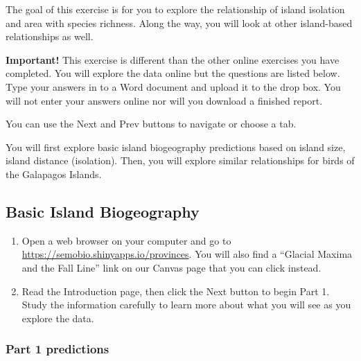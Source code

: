\documentclass[11pt, addpoints]{exam}
\begin{document}
The goal of this exercise is for you to explore the relationship of
island isolation and area with species richness. Along the way, you will
look at other island-based relationships as well.

\textbf{Important!} This exercise is different than the other online exercises you have completed. You will explore the data online but
the questions are listed below. Type your answers in to a Word document
and upload it to the drop box. You will not enter your answers online nor will you download a finished report.

You can use the Next and Prev buttons to navigate or choose a tab.

You will first explore basic island biogeography predictions based on island size, island distance (isolation). Then, you will explore similar relationships for birds of the Galapagos Islands.

\subsection*{Basic Island Biogeography}

\begin{enumerate}
	\item Open a web browser on your computer and go to \url{https://semobio.shinyapps.io/provinces}. You will also find a “Glacial Maxima and the Fall Line” link on our Canvas page that you can click instead.
	
	\item Read the Introduction page, then click the Next button to begin 
	Part 1. Study the information carefully to learn more about what you
	will see as you explore the data. 
\end{enumerate}

\subsubsection*{Part 1 predictions}
\end{document}
